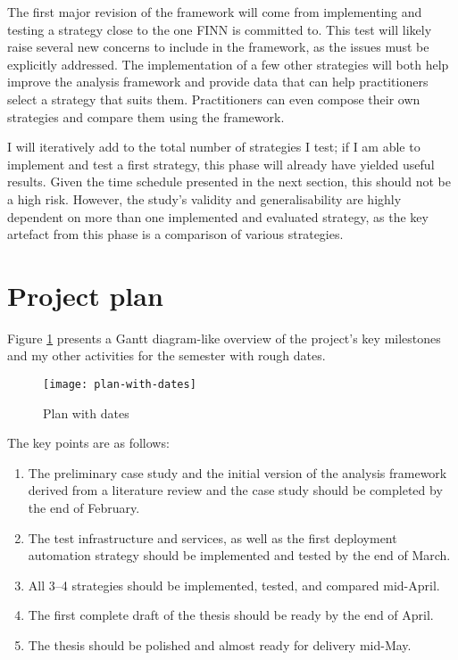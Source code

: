 The first major revision of the framework will come from implementing and testing a strategy close to the one FINN is committed to. This test will likely raise several new concerns to include in the framework, as the issues must be explicitly addressed. The implementation of a few other strategies will both help improve the analysis framework and provide data that can help practitioners select a strategy that suits them. Practitioners can even compose their own strategies and compare them using the framework.

I will iteratively add to the total number of strategies I test; if I am able to implement and test a first strategy, this phase will already have yielded useful results. Given the time schedule presented in the next section, this should not be a high risk. However, the study's validity and generalisability are highly dependent on more than one implemented and evaluated strategy, as the key artefact from this phase is a comparison of various strategies.

\section{Project plan}

Figure \ref{fig:plan-with-dates} presents a Gantt diagram-like overview of the project's key milestones and my other activities for the semester with rough dates.

\begin{figure}[H]
    \label{fig:plan-with-dates}
\centerline{\texttt{[image: plan-with-dates]}}
    \caption{Plan with dates}
\end{figure}

The key points are as follows:

\begin{enumerate}
  \item The preliminary case study and the initial version of the analysis framework derived from a literature review and the case study should be completed by the end of February.
  \item The test infrastructure and services, as well as the first deployment automation strategy should be implemented and tested by the end of March.
  \item All 3--4 strategies should be implemented, tested, and compared mid-April.
  \item The first complete draft of the thesis should be ready by the end of April.
  \item The thesis should be polished and almost ready for delivery mid-May.
\end{enumerate}

